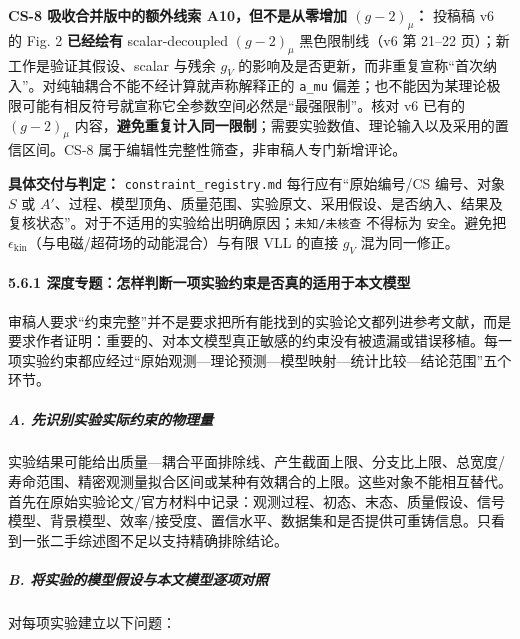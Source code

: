 \documentclass[
  chinese,
  UTF8]{ctexart}
\begin{document}
\textbf{CS-8 吸收合并版中的额外线索 A10，但不是从零增加 \((g-2)_\mu\)：}
投稿稿 v6 的 Fig. 2 \textbf{已经绘有} scalar-decoupled \((g-2)_\mu\)
黑色限制线（v6 第 21--22 页）；新工作是验证其假设、scalar 与残余 \(g_V\)
的影响及是否更新，而非重复宣称``首次纳入''。对纯轴耦合不能不经计算就声称解释正的
\texttt{a\_mu}
偏差；也不能因为某理论极限可能有相反符号就宣称它全参数空间必然是``最强限制''。核对
v6 已有的 \((g-2)_\mu\)
内容，\textbf{避免重复计入同一限制}；需要实验数值、理论输入以及采用的置信区间。CS-8
属于编辑性完整性筛查，非审稿人专门新增评论。

\textbf{具体交付与判定：} \texttt{constraint\_registry.md}
每行应有``原始编号/CS 编号、对象 \(S\) 或
\(A'\)、过程、模型顶角、质量范围、实验原文、采用假设、是否纳入、结果及复核状态''。对于不适用的实验给出明确原因；\texttt{未知/未核查}
不得标为 \texttt{安全}。避免把
\(\epsilon_{\mathrm{kin}}\)（与电磁/超荷场的动能混合）与有限 VLL 的直接
\(g_V\) 混为同一修正。

\paragraph{5.6.1
深度专题：怎样判断一项实验约束是否真的适用于本文模型}\label{ux6df1ux5ea6ux4e13ux9898ux600eux6837ux5224ux65adux4e00ux9879ux5b9eux9a8cux7ea6ux675fux662fux5426ux771fux7684ux9002ux7528ux4e8eux672cux6587ux6a21ux578b}

审稿人要求``约束完整''并不是要求把所有能找到的实验论文都列进参考文献，而是要求作者证明：重要的、对本文模型真正敏感的约束没有被遗漏或错误移植。每一项实验约束都应经过``原始观测---理论预测---模型映射---统计比较---结论范围''五个环节。

\subparagraph{A.
先识别实验实际约束的物理量}\label{a.-ux5148ux8bc6ux522bux5b9eux9a8cux5b9eux9645ux7ea6ux675fux7684ux7269ux7406ux91cf}

实验结果可能给出质量---耦合平面排除线、产生截面上限、分支比上限、总宽度/寿命范围、精密观测量拟合区间或某种有效耦合的上限。这些对象不能相互替代。首先在原始实验论文/官方材料中记录：观测过程、初态、末态、质量假设、信号模型、背景模型、效率/接受度、置信水平、数据集和是否提供可重铸信息。只看到一张二手综述图不足以支持精确排除结论。

\subparagraph{B.
将实验的模型假设与本文模型逐项对照}\label{b.-ux5c06ux5b9eux9a8cux7684ux6a21ux578bux5047ux8bbeux4e0eux672cux6587ux6a21ux578bux9010ux9879ux5bf9ux7167}

对每项实验建立以下问题：
\end{document}
